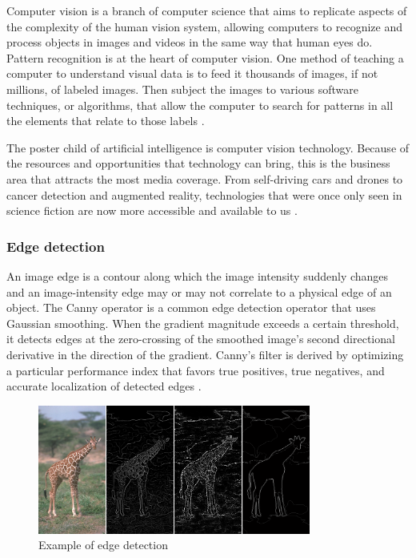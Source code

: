 Computer vision is a branch of computer science that aims to replicate aspects of the complexity of the human vision system, allowing computers to recognize and process objects in images and videos in the same way that human eyes do. Pattern recognition is at the heart of computer vision. One method of teaching a computer to understand visual data is to feed it thousands of images, if not millions, of labeled images. Then subject the images to various software techniques, or algorithms, that allow the computer to search for patterns in all the elements that relate to those labels \cite{mihajlovic_everything_nodate}.

The poster child of artificial intelligence is computer vision technology. Because of the resources and opportunities that technology can bring, this is the business area that attracts the most media coverage. From self-driving cars and drones to cancer detection and augmented reality, technologies that were once only seen in science fiction are now more accessible and available to us \cite{ambalina_5_2020}.




\subsubsection*{Edge detection} 
An image edge is a contour along which the image intensity suddenly changes and an image-intensity edge may or may not correlate to a physical edge of an object. The Canny operator is a common edge detection operator that uses Gaussian smoothing. When the gradient magnitude exceeds a certain threshold, it detects edges at the zero-crossing of the smoothed image's second directional derivative in the direction of the gradient. Canny's filter is derived by optimizing a particular performance index that favors true positives, true negatives, and accurate localization of detected edges \cite{nalwa_edge_1993}.

\begin{figure}[ht]
    \centering
    \includegraphics[width=0.8\textwidth]{graphics/canny.png}
    \caption{Example of edge detection \cite{nalwa_edge_1993}}
    \label{fig:edgedetection}
\end{figure}

